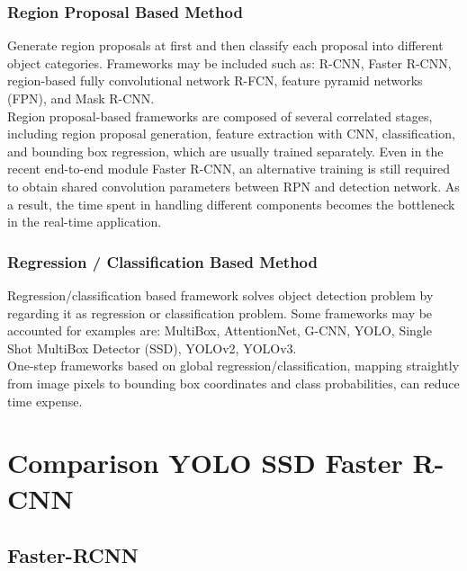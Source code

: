         \subsubsection{Region Proposal Based Method}
            Generate region proposals at first and then classify each proposal into different object categories. Frameworks may be included such as: R-CNN, Faster R-CNN, region-based fully convolutional network R-FCN, feature pyramid networks (FPN), and Mask R-CNN. \\
            \vspace{3mm}
            Region proposal-based frameworks are composed of several correlated stages, including region proposal generation, feature extraction with CNN, classification, and bounding box regression, which are usually trained separately. Even in the recent end-to-end module Faster R-CNN, an alternative training is still required to obtain shared convolution parameters between RPN and detection network. As a result, the time spent in handling different components becomes the bottleneck in the real-time application. \\

        \subsubsection{Regression / Classification Based Method}
            Regression/classification based framework solves object detection problem by regarding it as regression or classification problem. Some frameworks may be accounted for examples are: MultiBox, AttentionNet, G-CNN, YOLO, Single Shot MultiBox Detector (SSD), YOLOv2, YOLOv3. \\
            \vspace{3mm}
            One-step frameworks based on global regression/classification, mapping straightly from image pixels to bounding box coordinates and class probabilities, can reduce time expense. \\

\section{Comparison YOLO SSD Faster R-CNN}

    \subsection{Faster-RCNN}
